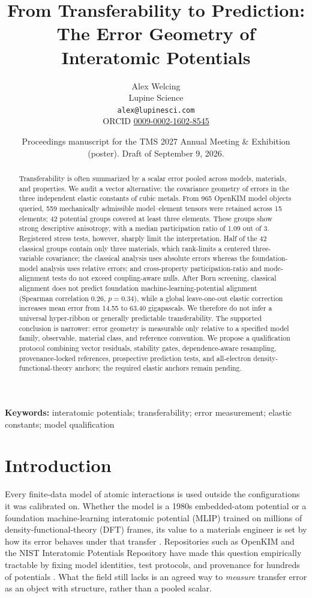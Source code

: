 \documentclass[11pt]{article}
\title{From Transferability to Prediction:\\The Error Geometry of Interatomic Potentials}
\author{Alex Welcing\\Lupine Science\\\texttt{alex@lupinesci.com}\\ORCID \href{https://orcid.org/0009-0002-1602-8545}{0009-0002-1602-8545}}
\date{Proceedings manuscript for the TMS 2027 Annual Meeting \& Exhibition (poster). Draft of September 9, 2026.}
\begin{document}
\maketitle

\begin{abstract}
\noindent
Transferability is often summarized by a scalar error pooled across models, materials, and properties. We audit a vector alternative: the covariance geometry of errors in the three independent elastic constants of cubic metals. From 965 OpenKIM model objects queried, 559 mechanically admissible model--element tensors were retained across 15 elements; 42 potential groups covered at least three elements. These groups show strong descriptive anisotropy, with a median participation ratio of 1.09 out of 3. Registered stress tests, however, sharply limit the interpretation. Half of the 42 classical groups contain only three materials, which rank-limits a centered three-variable covariance; the classical analysis uses absolute errors whereas the foundation-model analysis uses relative errors; and cross-property participation-ratio and mode-alignment tests do not exceed coupling-aware nulls. After Born screening, classical alignment does not predict foundation machine-learning-potential alignment (Spearman correlation 0.26, $p=0.34$), while a global leave-one-out elastic correction increases mean error from 14.55 to 63.40 gigapascals. We therefore do not infer a universal hyper-ribbon or generally predictable transferability. The supported conclusion is narrower: error geometry is measurable only relative to a specified model family, observable, material class, and reference convention. We propose a qualification protocol combining vector residuals, stability gates, dependence-aware resampling, provenance-locked references, prospective prediction tests, and all-electron density-functional-theory anchors; the required elastic anchors remain pending.
\end{abstract}

\noindent\textbf{Keywords:} interatomic potentials; transferability; error measurement; elastic constants; model qualification

\section{Introduction}

Every finite-data model of atomic interactions is used outside the configurations it was calibrated on. Whether the model is a 1980s embedded-atom potential or a foundation machine-learning interatomic potential (MLIP) trained on millions of density-functional-theory (DFT) frames, its value to a materials engineer is set by how its error behaves under that transfer \citep{frederiksen2004,kurniawan2022,chiang2025mliparena}. Repositories such as OpenKIM and the NIST Interatomic Potentials Repository have made this question empirically tractable by fixing model identities, test protocols, and provenance for hundreds of potentials \citep{openkim,nist_ipr}. What the field still lacks is an agreed way to \emph{measure} transfer error as an object with structure, rather than a pooled scalar.
\end{document}
